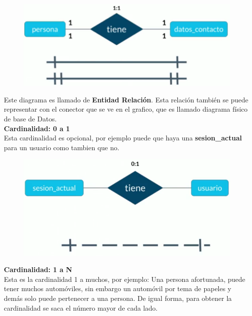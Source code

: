 \documentclass{article}
\begin{document}
\begin{figure}[h!]
    \centering
      \includegraphics[scale=0.45]{./Pictures/014_card_1_1.png}
\end{figure}

Este diagrama es llamado de \textbf{Entidad Relación}. Esta relación también se
puede representar con el conector que se ve en el grafico, que es llamado
diagrama físico de base de Datos.\\

\textbf{Cardinalidad: 0 a 1}\\
Esta cardinalidad es opcional, por ejemplo puede que haya una
\textbf{sesion\_actual} para un usuario como tambien que no.

\newpage

\begin{figure}[h!]
    \centering
      \includegraphics[scale=0.45]{./Pictures/015_card_0_1.png}
\end{figure}

\textbf{Cardinalidad: 1 a N}\\
Esta es la cardinalidad 1 a muchos, por ejemplo: Una persona afortunada, puede
tener muchos automóviles, sin embargo un automóvil por tema de papeles y demás
solo puede pertenecer a una persona. De igual forma, para obtener la
cardinalidad se saca el número mayor de cada lado.\\
\end{document}
